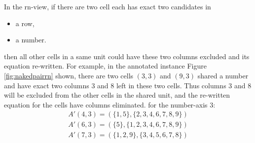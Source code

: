 \documentclass[11pt]{report}
\newcommand{\set}[1]{\{ #1 \}}
\begin{document}
In the rn-view, if there are two cell each has exact two candidates in
\begin{itemize}
\item a row,
\item a number.
\end{itemize}
then all other cells in a same unit could have these two columns excluded and its equation re-written. For example, in the annotated instance Figure \ref{fig:nakedpairrn} shown, there are two cells $(3,3)$ and $(9,3)$ shared a number and have exact two columns $3$ and $8$ left in these two cells. Thus columns $3$ and $8$ will be excluded from the other cells in the shared unit, and the re-written equation for the cells have columns eliminated.
for the number-axis $3$:
\begin{eqnarray*}
A'(4,3) = (\set{1, 5}, \set{2, 3, 4, 6, 7, 8, 9})\\
A'(6,3) = (\set{5}, \set{1, 2, 3, 4, 6, 7, 8 ,9})\\
A'(7,3) = (\set{1, 2, 9}, \set{3, 4, 5 ,6 ,7, 8})\\
\end{eqnarray*}
\end{document}
